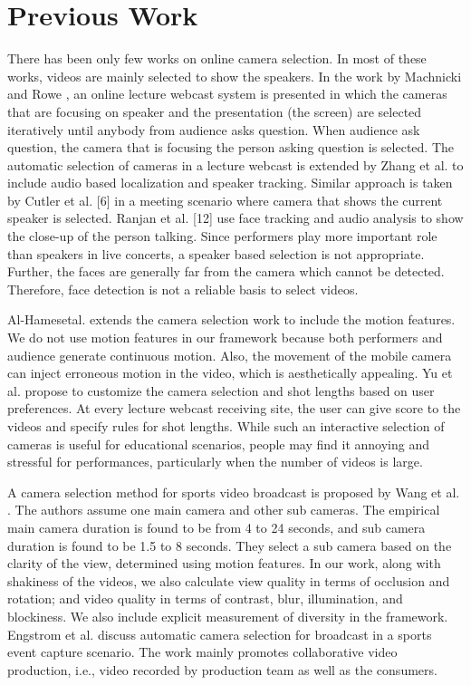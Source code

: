 \documentclass{sig-alternate}
\begin{document}
\section{Previous Work}
There has been only few works on online camera selection. In most of these works, videos are mainly selected to show the speakers. In the work by Machnicki and Rowe \cite{piron1976foundations}, an online lecture webcast system is presented in which the cameras that are focusing on speaker and the presentation (the screen) are selected iteratively until anybody from audience asks question. When audience ask question, the camera that is focusing the person asking question is selected. The automatic selection of cameras in a lecture webcast is extended by Zhang et al. \cite{talay1994numerical} to include audio based localization and speaker tracking. Similar approach is taken by Cutler et al. [6] in a meeting scenario where camera that shows the current speaker is selected. Ranjan et al. [12] use face tracking and audio analysis to show the close-up of the person talking. Since performers play more important role than speakers in live concerts, a speaker based selection is not appropriate. Further, the faces are generally far from the camera which cannot be detected. Therefore, face detection is not a reliable basis to select videos.

 Al-Hamesetal.\cite{coddington1955theory} extends the camera selection work to include the motion features. We do not use motion features in our framework because both performers and audience generate continuous motion. Also, the movement of the mobile camera can inject erroneous motion in the video, which is aesthetically appealing. Yu et al. \cite{shampine1975computer} propose to customize the camera selection and shot lengths based on user preferences. At every lecture webcast receiving site, the user can give score to the videos and specify rules for shot lengths. While such an interactive selection of cameras is useful for educational scenarios, people may ﬁnd it annoying and stressful for performances, particularly when the number of videos is large. 
 
 A camera selection method for sports video broadcast is proposed by Wang et al. \cite{carter2007ceramic}. The authors assume one main camera and other sub cameras. The empirical main camera duration is found to be from 4 to 24 seconds, and sub camera duration is found to be 1.5 to 8 seconds. They select a sub camera based on the clarity of the view, determined using motion features. In our work, along with shakiness of the videos, we also calculate view quality in terms of occlusion and rotation; and video quality in terms of contrast, blur, illumination, and blockiness. We also include explicit measurement of diversity in the framework. Engstrom et al. \cite{frakes1992information} discuss automatic camera selection for broadcast in a sports event capture scenario. The work mainly promotes collaborative video production, i.e., video recorded by production team as well as the consumers.
 
\end{document}
